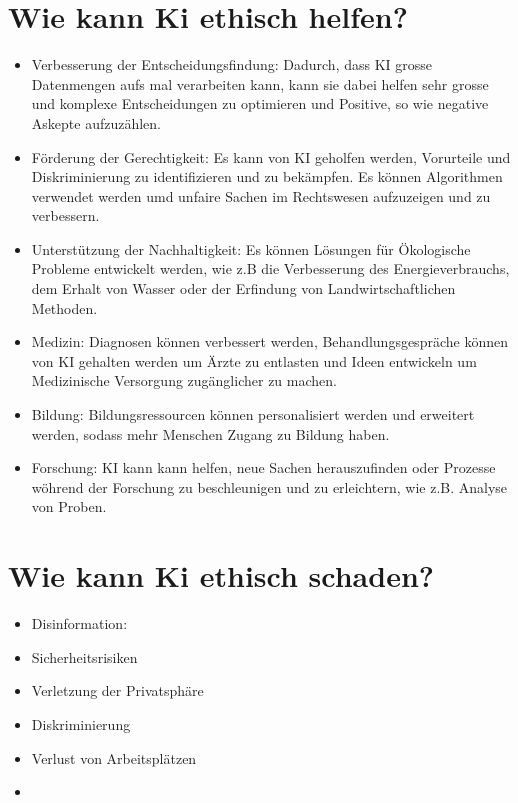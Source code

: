 \documentclass{report}
\begin{document}
\section{Wie kann Ki ethisch helfen?}
\begin{itemize}
    \item Verbesserung der Entscheidungsfindung: Dadurch, dass KI grosse Datenmengen aufs mal verarbeiten kann, kann sie dabei helfen sehr grosse und komplexe Entscheidungen zu optimieren und Positive, so wie negative Askepte aufzuzählen. 
    \item Förderung der Gerechtigkeit: Es kann von KI geholfen werden, Vorurteile und Diskriminierung zu identifizieren und zu bekämpfen. Es können Algorithmen verwendet werden umd unfaire Sachen im Rechtswesen aufzuzeigen und zu verbessern.
    \item Unterstützung der Nachhaltigkeit: Es können Lösungen für Ökologische Probleme entwickelt werden, wie z.B die Verbesserung des Energieverbrauchs, dem Erhalt von Wasser oder der Erfindung von Landwirtschaftlichen Methoden.
    \item Medizin: Diagnosen können verbessert werden, Behandlungsgespräche können von KI gehalten werden um Ärzte zu entlasten und Ideen entwickeln um Medizinische Versorgung zugänglicher zu machen.
    \item Bildung: Bildungsressourcen können personalisiert werden und erweitert werden, sodass mehr Menschen Zugang zu Bildung haben.
    \item Forschung: KI kann kann helfen, neue Sachen herauszufinden oder Prozesse wöhrend der Forschung zu beschleunigen und zu erleichtern, wie z.B. Analyse von Proben.
\end{itemize}

\section{Wie kann Ki ethisch schaden?}
\begin{itemize}
    \item Disinformation:
    \item Sicherheitsrisiken
    \item Verletzung der Privatsphäre
    \item Diskriminierung
    \item Verlust von Arbeitsplätzen
    \item 
\end{itemize}
\printbibliography
\end{document}
